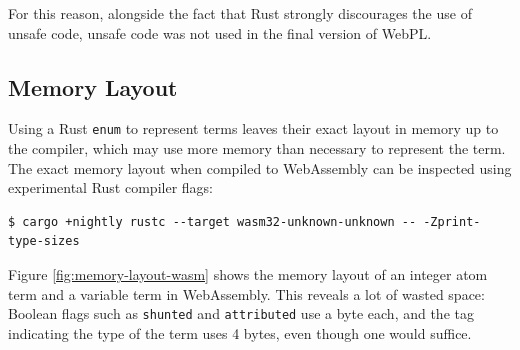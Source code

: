 For this reason, alongside the fact that Rust strongly discourages the use of unsafe code, unsafe code was not used in the final version of WebPL.

\subsection{Memory Layout}

Using a Rust \texttt{enum} to represent terms leaves their exact layout in memory up to the compiler, which may use more memory than necessary to represent the term. The exact memory layout when compiled to WebAssembly can be inspected using experimental Rust compiler flags:

\begin{verbatim}
$ cargo +nightly rustc --target wasm32-unknown-unknown -- -Zprint-type-sizes
\end{verbatim}

Figure \ref{fig:memory-layout-wasm} shows the memory layout of an integer atom term and a variable term in WebAssembly. This reveals a lot of wasted space: Boolean flags such as \texttt{shunted} and \texttt{attributed} use a byte each, and the tag indicating the type of the term uses 4 bytes, even though one would suffice.

